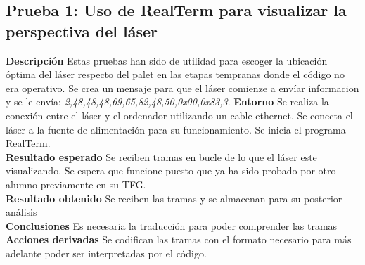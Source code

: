 \subsection{Prueba 1: Uso de RealTerm para visualizar la perspectiva del láser}
\textbf{Descripción} Estas pruebas han sido de utilidad para escoger la ubicación óptima del láser respecto del palet en las etapas tempranas donde el código no era operativo. Se crea un mensaje para que el láser comienze a envíar informacion y se le envía: \textit{2,48,48,48,69,65,82,48,50,0x00,0x83,3}.
\textbf{Entorno} Se realiza la conexión entre el láser y el ordenador utilizando un cable ethernet. Se conecta el láser a la fuente de alimentación para su funcionamiento. Se inicia el programa RealTerm. \\
\textbf{Resultado esperado} Se reciben tramas en bucle de lo que el láser este visualizando. Se espera que funcione puesto que ya ha sido probado por otro alumno previamente en su TFG.\\
\textbf{Resultado obtenido} Se reciben las tramas y se almacenan para su posterior análisis\\
\textbf{Conclusiones} Es necesaria la traducción para poder comprender las tramas\\
\textbf{Acciones derivadas}  Se codifican las tramas con el formato necesario para más adelante poder ser interpretadas por el código.

\newpage

